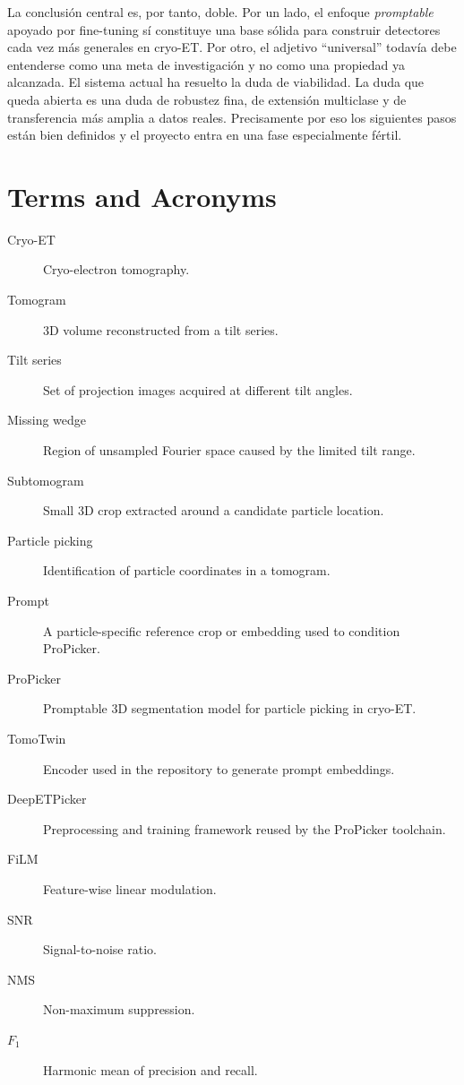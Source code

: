 \documentclass[12pt,a4paper]{report}
\begin{document}
La conclusión central es, por tanto, doble. Por un lado, el enfoque \emph{promptable} apoyado por fine-tuning sí constituye una base sólida para construir detectores cada vez más generales en cryo-ET. Por otro, el adjetivo \enquote{universal} todavía debe entenderse como una meta de investigación y no como una propiedad ya alcanzada. El sistema actual ha resuelto la duda de viabilidad. La duda que queda abierta es una duda de robustez fina, de extensión multiclase y de transferencia más amplia a datos reales. Precisamente por eso los siguientes pasos están bien definidos y el proyecto entra en una fase especialmente fértil.

\cleardoublepage

\tableofcontents
\cleardoublepage
\begingroup
\renewcommand{\addvspace}[1]{}
{}
\listoffigures
\endgroup
\cleardoublepage
\begingroup
\renewcommand{\addvspace}[1]{}
{}
\listoftables
\endgroup
\cleardoublepage

\chapter*{Terms and Acronyms}

\begin{description}
  \item[Cryo-ET] Cryo-electron tomography.
  \item[Tomogram] 3D volume reconstructed from a tilt series.
  \item[Tilt series] Set of projection images acquired at different tilt angles.
  \item[Missing wedge] Region of unsampled Fourier space caused by the limited tilt range.
  \item[Subtomogram] Small 3D crop extracted around a candidate particle location.
  \item[Particle picking] Identification of particle coordinates in a tomogram.
  \item[Prompt] A particle-specific reference crop or embedding used to condition ProPicker.
  \item[ProPicker] Promptable 3D segmentation model for particle picking in cryo-ET.
  \item[TomoTwin] Encoder used in the repository to generate prompt embeddings.
  \item[DeepETPicker] Preprocessing and training framework reused by the ProPicker toolchain.
  \item[FiLM] Feature-wise linear modulation.
  \item[SNR] Signal-to-noise ratio.
  \item[NMS] Non-maximum suppression.
  \item[\(F_1\)] Harmonic mean of precision and recall.
\end{description}
\end{document}
